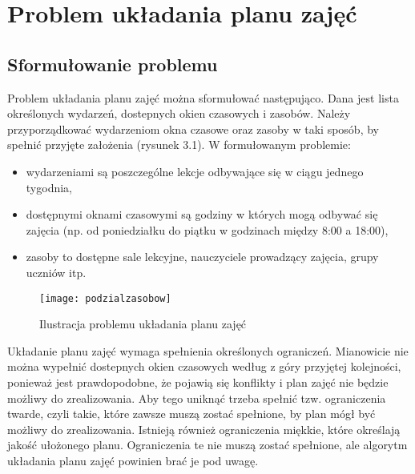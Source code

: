 \chapter{Problem układania planu zajęć}
\section{Sformułowanie problemu}
Problem układania planu zajęć można sformułować następująco. Dana jest lista określonych wydarzeń, dostepnych okien czasowych i zasobów. Należy przyporządkować wydarzeniom okna czasowe oraz zasoby w taki sposób, by spełnić przyjęte założenia (rysunek 3.1). W formułowanym problemie:
\begin{itemize}
	\item wydarzeniami są poszczególne lekcje odbywające się w ciągu jednego tygodnia,
	\item dostępnymi oknami czasowymi są godziny w których mogą odbywać się zajęcia (np. od poniedziałku do piątku w godzinach między 8:00 a 18:00),
	\item zasoby to dostępne sale lekcyjne, nauczyciele prowadzący zajęcia, grupy uczniów itp.
\end{itemize}


\begin{figure}
	\centering
	\texttt{[image: podzialzasobow]}
	\caption{Ilustracja problemu układania planu zajęć}
	\label{fig: podzialzasobow}
\end{figure}

Układanie planu zajęć wymaga spełnienia określonych ograniczeń. Mianowicie nie można wypełnić dostepnych okien czasowych według z góry przyjętej kolejności, ponieważ jest prawdopodobne, że pojawią się konflikty i plan zajęć nie będzie możliwy do zrealizowania. Aby tego uniknąć trzeba spełnić tzw. ograniczenia twarde, czyli takie, które zawsze muszą zostać spełnione, by plan mógł być możliwy do zrealizowania. Istnieją również ograniczenia miękkie, które określają jakość ułożonego planu. Ograniczenia te nie muszą zostać spełnione, ale algorytm układania planu zajęć powinien brać je pod uwagę.

